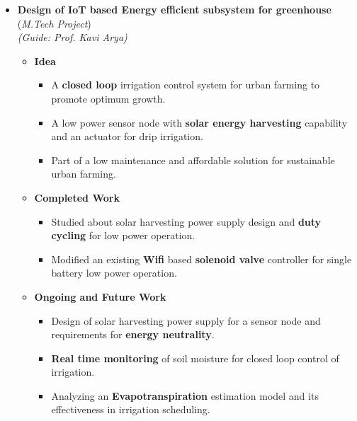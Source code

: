 \documentclass{article}
\begin{document}
\vspace{-2mm}\underline{}
\begin{itemize}[leftmargin=3.5mm]
	\setlength{\itemsep}{1mm}
	\item \textbf{Design of IoT based Energy efficient subsystem for greenhouse} (\textit{M.Tech Project})\hfill{}
	\\\textit{(Guide: Prof. Kavi Arya)}
	\vspace{-8pt}
	\renewcommand{\labelitemii}{--}
	\begin{itemize}[leftmargin=3.5mm]
		\setlength{\itemsep}{-1mm}
		\item \textbf{Idea}
		\renewcommand{\labelitemiii}{-}
		\vspace{-1mm}
		\begin{itemize}[leftmargin=3.5mm]
			\setlength{\itemsep}{0.4mm}
			\item A \textbf{closed loop} irrigation control system for urban farming to promote optimum growth.
			\item A low power sensor node with \textbf{solar energy harvesting} capability and an actuator for drip irrigation.
			\item Part of a low maintenance and affordable solution for sustainable urban farming.
		\end{itemize}
		\item{\textbf{Completed Work}}
		\begin{itemize}[leftmargin=3.5mm]
			\setlength{\itemsep}{0.4mm}
			\item Studied about solar harvesting power supply design and \textbf{duty cycling} for low power operation.
			\item Modified an existing \textbf{Wifi} based \textbf{solenoid valve} controller for single battery low power operation.
		\end{itemize}
		\item \textbf{Ongoing and Future Work}
		\begin{itemize}[leftmargin=3.5mm]	\setlength{\itemsep}{0.4mm}
			\item Design of solar harvesting power supply for a sensor node  and requirements for \textbf{energy neutrality}.
			\item \textbf{Real time monitoring} of soil moisture for closed loop control of irrigation.
			\item Analyzing an  \textbf{Evapotranspiration} estimation model and its effectiveness in irrigation scheduling.
		\end{itemize}
		
	\end{itemize}
\end{itemize}
\end{document}
